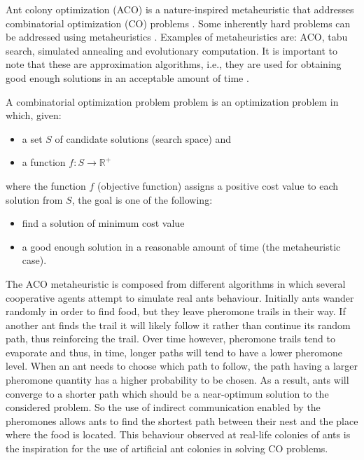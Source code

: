 Ant colony optimization (ACO) \cite{Dorigo04Ant}  is a nature-inspired metaheuristic that addresses combinatorial optimization (CO) problems \cite{Papadimitriou82Combinatorial}. Some inherently hard problems can be addressed using metaheuristics \cite{Blum03Metaheuristics}. Examples of metaheuristics are: ACO,  tabu search, simulated annealing and evolutionary computation. It is important to note that these are approximation algorithms, i.e., they are used for obtaining good enough solutions in an acceptable amount of time \cite{Glover89Tabu,Glover90Tabu,Kirkpatrick83Optimization}.

\begin{definition}
\label{def:co}
A combinatorial optimization problem problem is an optimization problem in which, given:
\begin{itemize}
\item a set $S$ of candidate solutions (search space) and
\item a function $f : S \rightarrow \mathbb{R}^{+}$
\end{itemize}
where the function $f$ (objective function) assigns a positive cost value to each solution from $S$, the goal is one of the following:
\begin{itemize}
\item find a solution of minimum cost value
\item a good enough solution in a reasonable amount of time (the metaheuristic case).
\end{itemize}
\end{definition}


The ACO metaheuristic is composed from different algorithms in which several cooperative agents attempt to simulate real ants behaviour. Initially ants wander randomly in order to find food, but they leave pheromone trails in their way. If another ant finds the trail it will likely follow it
rather than continue its random path, thus reinforcing the trail. Over time however, pheromone trails tend to evaporate and thus, in time, longer paths will tend to have a lower pheromone level.
When an ant needs to choose which path to follow, the path having a larger pheromone quantity has a higher probability to be chosen. As a result, ants will converge to a shorter path which should be a near-optimum solution to the considered problem. So the use of indirect communication enabled by the pheromones allows ants to find the shortest path between their nest and the place where the food is located. This behaviour observed at real-life colonies of ants is the inspiration for the use of artificial ant colonies in solving CO problems.

